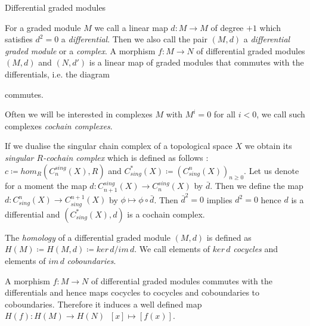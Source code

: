 \begin{Definition}{Differential graded modules}

For a graded module $M$ we call a linear map $d \colon M \to M$ of degree $+1$ which satisfies $ d^2 = 0$ a \emph{differential}.
Then we also call the pair $(M , d)$ a \emph{differential graded module} or a \emph{complex}.
A morphism $f \colon M \to N$ of differential graded modules $(M,d)$ and $(N,d')$ is a linear map of graded modules that commutes with the 
differentials, i.e. the diagram \\

\centerline{
}
commutes.
\end{Definition}

Often we will be interested in complexes $M$ with $M^i = 0$ for all $i < 0$, we call such complexes \emph{cochain complexes}.

\begin{Example}
 If we dualise the singular chain complex of a topological space $X$ we obtain its \emph{singular $R$-cochain complex} which 
 is defined as follows : \newline
 $c \coloneqq hom_R(C_n^{sing}(X),R)$ and $C^*_{sing}(X) \coloneqq (C^n_{sing}(X))_{n \geq 0}$. \newline
 Let us denote for a moment the map $d \colon C_{n+1}^{sing}(X) \to C_n^{sing}(X)$ by $\bar{d}$. Then we define the map
 $d \colon C_{sing}^n(X) \to C_{sing}^{n+1}(X)$ by $\phi \mapsto \phi \circ \bar{d}$. Then $\bar{d}^2 = 0$ implies $d^2 = 0$
 hence $d$ is a differential and $(C^*_{sing}(X),d)$ is a cochain complex.
\end{Example}

\begin{Definition}
The \emph{homology} of a differential graded module $(M,d)$ is defined as \newline ${H(M) \coloneqq 
H(M,d) \coloneqq ker \, d / im \, d}$.
We call elements of $ker \, d$ \emph{cocycles} and elements of $im \, d$ \emph{coboundaries}.
\end{Definition}

A morphism $f \colon M \to N$ of differential graded modules commutes with the differentials and hence maps cocycles to cocycles
and coboundaries to coboundaries. Therefore it induces a well defined map $H(f) \colon H(M) \to H(N) \; \; [x] \mapsto [f(x)]$. 

